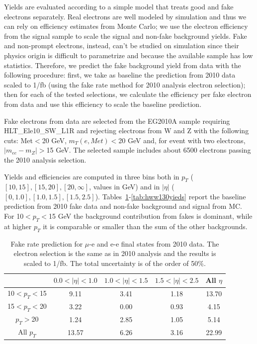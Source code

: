 Yields are evaluated according to a simple model that treats good and fake electrons separately.
Real electrons are well modeled by simulation and thus we can rely on efficiency estimates from Monte Carlo; 
we use the electron efficiency from the signal sample to scale the signal and non-fake background yields.
Fake and non-prompt electrons, instead, can't be studied on simulation since their physics origin is difficult to parametrize and because
the available sample has low statistics. 
Therefore, we predict the fake background yield from data with the following procedure: 
first, we take as baseline the prediction from 2010 data scaled to 1/fb (using the fake rate method for 2010 analysis electron selection); 
then for each of the tested selections, we calculate the efficiency per fake electron from data and use this efficiency to scale the baseline prediction.

Fake electrons from data are selected from the EG2010A sample requiring HLT\_Ele10\_SW\_L1R and rejecting electrons from W and Z with the following cuts:
Met$<$20 GeV, $m_T(e, Met)<$20 GeV and, for event with two electrons, $|m_{ee}-m_Z|>$15 GeV. 
The selected sample includes about 6500 electrons passing the 2010 analysis selection.

Yields and efficiencies are computed in three bins both in $p_T$ ($[10,15],[15,20],[20,\infty]$, values in GeV) 
and in $|\eta|$ ($[0,1.0],[1.0,1.5],[1.5,2.5]$). 
Tables~\ref{tab:fakeBaseline}-\ref{tab:hww130yieds} report the baseline prediction from 2010 fake data and non-fake background and signal from MC.
For 10$<p_T<$15 GeV the background contribution from fakes is dominant, while at higher $p_T$ it is comparable or smaller than the sum of the other backgrounds.

\begin{table}[!ht]
\begin{center}
\begin{tabular}{|c|ccc|c|} \hline
 & $0.0<|\eta|<1.0$ & $1.0<|\eta|<1.5$ & $1.5<|\eta|<2.5$ & All $\eta$ \\ \hline
10$<p_T<$15 & 9.11 & 3.41 & 1.18 & 13.70 \\
15$<p_T<$20 & 3.22 & 0.00 & 0.93 & 4.15 \\
$p_T>$20 & 1.24 & 2.85 & 1.05 & 5.14 \\  \hline
All $p_T$ & 13.57 & 6.26 & 3.16 & 22.99 \\ \hline
\end{tabular}
\caption{Fake rate prediction for $\mu$-e and e-e final states from 2010 data. 
The electron selection is the same as in 2010 analysis and the results is scaled to 1/fb.
The total uncertainty is of the order of 50\%.
\label{tab:fakeBaseline}}
\end{center}
\end{table}

